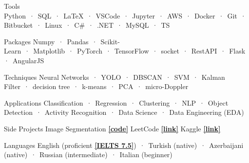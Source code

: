 

\begin{cvskills}

  \cvskill
    {Tools} %
    {Python~·~SQL~·~LaTeX~·~VSCode~·~Jupyter~·~AWS~·~Docker~·~Git~·~Bitbucket~·~Linux~·~C\#~·~.NET~·~MySQL~·~TS} %

  \cvskill
    {Packages} %
    {Numpy~·~Pandas~·~Scikit-Learn~·~Matplotlib~·~PyTorch~·~TensorFlow~·~socket~·~RestAPI~·~Flask~·~AngularJS} %

  \cvskill
    {Techniques} %
    {Neural Networks~·~YOLO~·~DBSCAN~·~SVM~·~Kalman Filter~·~decision tree~·~k-means~·~PCA~·~micro-Doppler} %
    
  \cvskill
    {Applications} %
    {Classification~·~Regression~·~Clustering~·~NLP~·~Object Detection~·~Activity Recognition~·~Data Science~·~Data Engineering (EDA)} %
    

  \cvskill
    {Side Projects} %
    {Image Segmentation \href{https://github.com/enverbashirov/Image-Segmentation-Superpixels}{\textbf{[code]}} LeetCode \href{https://leetcode.com/enverbashirov/}{\textbf{[link]}} Kaggle \href{https://www.kaggle.com/enverbashirov}{\textbf{[link]}}} %

  \hline
  
  \cvskill
    {Languages} %
    {English (proficient \href{https://github.com/enverbashirov/Resume-Enver-Bashirov/blob/main/certificates/ielts_2016.pdf}{\textbf{[IELTS 7.5]}})~·~Turkish (native)~·~Azerbaijani (native)~·~Russian (intermediate)~·~Italian (beginner)} %




\end{cvskills}
